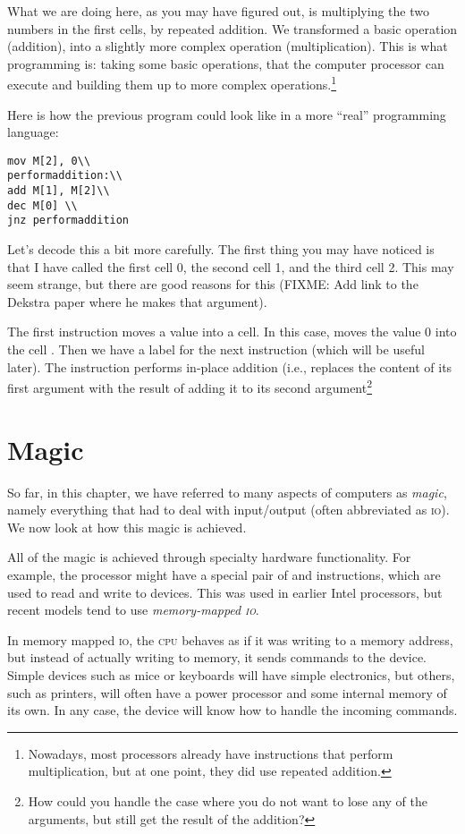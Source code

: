 What we are doing here, as you may have figured out, is multiplying the two
numbers in the first cells, by repeated addition. We transformed a basic
operation (addition), into a slightly more complex operation (multiplication).
This is what programming is: taking some basic operations, that the computer
processor can execute and building them up to more complex
operations.\footnote{Nowadays, most processors already have instructions that
perform multiplication, but at one point, they did use repeated addition.}

Here is how the previous program could look like in a more ``real'' programming
language:

\begin{verbatim}
mov M[2], 0\\
performaddition:\\
add M[1], M[2]\\
dec M[0] \\
jnz performaddition
\end{verbatim}

Let's decode this a bit more carefully. The first thing you may have noticed is
that I have called the first cell 0, the second cell 1, and the third cell 2.
This may seem strange, but there are good reasons for this (FIXME: Add link to
the Dekstra paper where he makes that argument).

The first instruction  moves a value into a cell. In this
case, moves the value 0 into the cell . Then we have a label
for the next instruction (which will be useful later). The 
instruction performs in-place addition (i.e., replaces the content of its first
argument with the result of adding it to its second argument\footnote{How could
you handle the case where you do not want to lose any of the arguments, but
still get the result of the addition? }

\section{Magic}

So far, in this chapter, we have referred to many aspects of computers as
\textit{magic}, namely everything that had to deal with input/output (often
abbreviated as \textsc{io}). We now look at how this magic is achieved.

All of the magic is achieved through specialty hardware functionality. For
example, the processor might have a special pair of  and
 instructions, which are used to read and write to devices.
This was used in earlier Intel processors, but recent models tend to use
\emph{memory-mapped \textsc{io}}.

In memory mapped \textsc{io}, the \textsc{cpu} behaves as if it was writing to
a memory address, but instead of actually writing to memory, it sends commands
to the device. Simple devices such as mice or keyboards will have simple
electronics, but others, such as printers, will often have a power processor
and some internal memory of its own. In any case, the device will know how to
handle the incoming commands.

